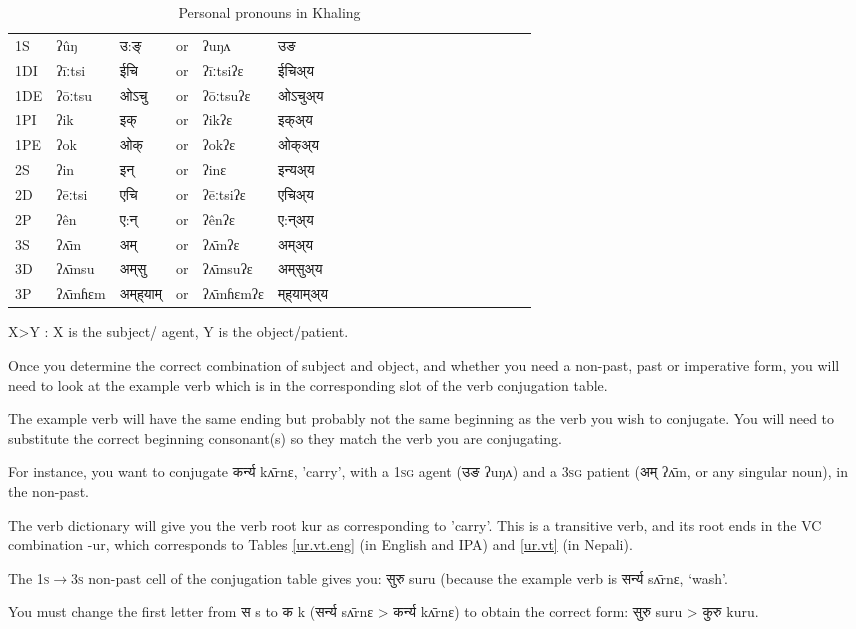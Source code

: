 \documentclass[oldfontcommands,oneside,a4paper,11pt]{article}
\newcommand{\ipa}[1]{{\phon #1}} %
\begin{document}
\begin{table}[H]
\caption{Personal pronouns in Khaling} \label{tab:pro} \centering
\begin{tabular}{llllllllllllllllllll}
\toprule
1S  & 	\ipa{ʔûŋ}  & उ:ङ्& 	or  & 	\ipa{ʔuŋʌ}  &  उङ \\
1DI  & 	\ipa{ʔīːtsi}  & ईचि& 	or  & 	\ipa{ʔīːtsiʔɛ}  &ईचिअ्य \\
1DE  & 	\ipa{ʔōːtsu}  &ओऽचु & 	or  & 	\ipa{ʔōːtsuʔɛ}  &ओऽचुअ्य \\
1PI  & 	\ipa{ʔik}  &इक् & 	or  & 	\ipa{ʔikʔɛ}  &इक्अ्य  \\
1PE  & 	\ipa{ʔok}  & ओक् & 	or  & 	\ipa{ʔokʔɛ}  &ओक्अ्य  \\
2S  & 	\ipa{ʔin}  & इन्& 	or  & 	\ipa{ʔinɛ}  &इन्यअ्य \\
2D  & 	\ipa{ʔēːtsi}  & एचि & 	or  & 	\ipa{ʔēːtsiʔɛ}  &एचिअ्य \\
2P  & 	\ipa{ʔên}  &ए:न् & 	or  & 	\ipa{ʔênʔɛ}  & ए:न्अ्य \\
3S  & 	\ipa{ʔʌ̄m}  &अम् & 	or  & 	\ipa{ʔʌ̄mʔɛ}  &अम्अ्य \\
3D  & 	\ipa{ʔʌ̄msu}  & अम्‌सु& 	or  & 	\ipa{ʔʌ̄msuʔɛ}  & अम्‌सुअ्य\\
3P  & 	\ipa{ʔʌ̄mɦɛm}  & अम्‌ह्‌याम् & 	or  & 	\ipa{ʔʌ̄mɦɛmʔɛ}  &म्‌ह्‌याम्अ्य \\
\bottomrule
\end{tabular}
\end{table}

X>Y	: X is the subject/ agent, Y is the object/patient.

Once you determine the correct combination of subject and object, and whether you need a non-past, past or imperative form, you will need to look at the example verb which is in the corresponding slot of the verb conjugation table.

The example verb will have the same ending but probably not the same beginning as the verb you wish to conjugate. You will need to substitute the correct beginning consonant(s) so they match the verb you are conjugating.

For instance, you want to conjugate कर्न्य \ipa{kʌ̄rnɛ}, 'carry', with a \textsc{1sg} agent (उङ \ipa{ʔuŋʌ}) and a  \textsc{3sg}  patient (अम् \ipa{ʔʌ̄m}, or any singular noun), in the non-past.

The verb dictionary will give you the verb root \ipa{kur} as corresponding to 'carry'. This is a transitive verb, and its root ends in the VC combination \ipa{-ur}, which corresponds to Tables \ref{ur.vt.eng} (in English and IPA) and \ref{ur.vt} (in Nepali).

The \textsc{1s$\rightarrow$3s} non-past cell of the conjugation table gives you: सुरु \ipa{suru} (because the example verb is सर्न्य \ipa{sʌ̄rnɛ}, `wash'.

You must change the first letter from स \ipa{s} to क \ipa{k} (सर्न्य \ipa{sʌ̄rnɛ} > कर्न्य \ipa{kʌ̄rnɛ}) to obtain the correct form: सुरु \ipa{suru} > कुरु \ipa{kuru}.


\setlength\parindent{0cm}
\setlength{\parskip}{-0.5cm}
\end{document}
